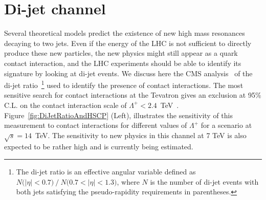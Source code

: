 \documentclass{PoS}
\begin{document}
\section{Di-jet channel} \label{dijet}
Several theoretical models predict the existence of new 
high mass resonances decaying to two jets.
Even if the energy of the LHC is not sufficient to directly produce 
these new particles, the new physics might still appear as 
a quark contact interaction,
and the LHC experiments should be able to identify its signature 
by looking at di-jet events.
We discuss here the CMS analysis~\cite{DIJETSNOTE}
of the di-jet ratio~\footnote{
The di-jet ratio is an effective angular variable
defined as $N\mbox{(}|\eta|<0.7\mbox{)}~/~N\mbox{(}0.7<|\eta|< 1.3 \mbox{)}$, 
where $N$ is the number of di-jet events with both jets satisfying the 
pseudo-rapidity requirements in parentheses.} 
used to identify the presence of contact interactions. 
The most sensitive search for contact interactions at the Tevatron 
gives an exclusion at 95\% C.L. on the contact interaction scale 
of $\Lambda^{+} < 2.4$~TeV~\cite{Abbott:1998wh}.  
Figure~\ref{fig:DiJetRatioAndHSCP} (Left), illustrates the sensitivity of this measurement to 
contact interactions for different values of $\Lambda^{+}$ for a scenario at $\sqrt{s} = 14$~TeV.
The sensitivity to new physics in this channel at 7 TeV is also expected to be rather high and 
is currently being estimated.
\end{document}
